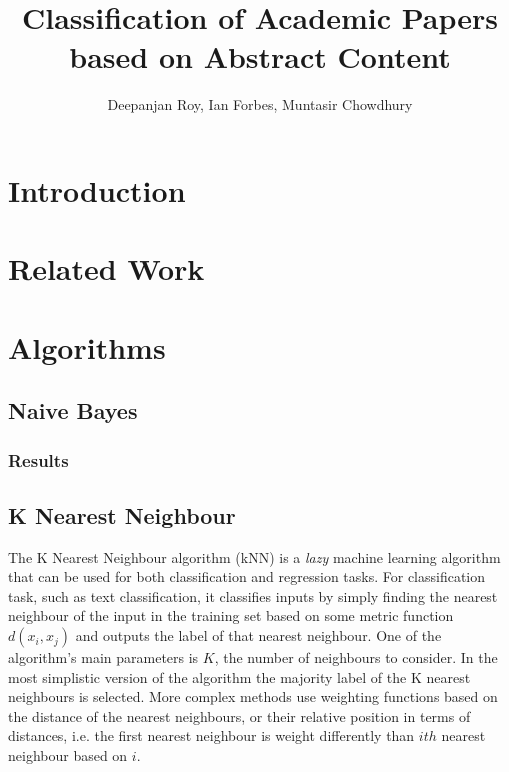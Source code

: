 \documentclass[10pt,twocolumn]{article}
\title {Classification of Academic Papers based on Abstract Content}
\author {Deepanjan Roy, Ian Forbes, Muntasir Chowdhury}
\begin{document}
\maketitle
{}

\section{Introduction}
\section{Related Work}

\section{Algorithms}
\subsection{Naive Bayes}
\subsubsection{Results}
\subsection{K Nearest Neighbour}
The K Nearest Neighbour algorithm (kNN) is a \textit{lazy} machine learning algorithm that can be used for both classification and regression tasks. For classification task, such as text classification, it classifies inputs by simply finding the nearest neighbour of the input in the training set based on some metric function $d(x_i,x_j)$ and outputs the label of that nearest neighbour. One of the algorithm's main parameters is $K$, the number of neighbours to consider. In the most simplistic version of the algorithm the majority label of the K nearest neighbours is selected. More complex methods use weighting functions based on the distance of the nearest neighbours, or their relative position in terms of distances, i.e. the first nearest neighbour is weight differently than $ith$ nearest neighbour based on $i$.
\end{document}
